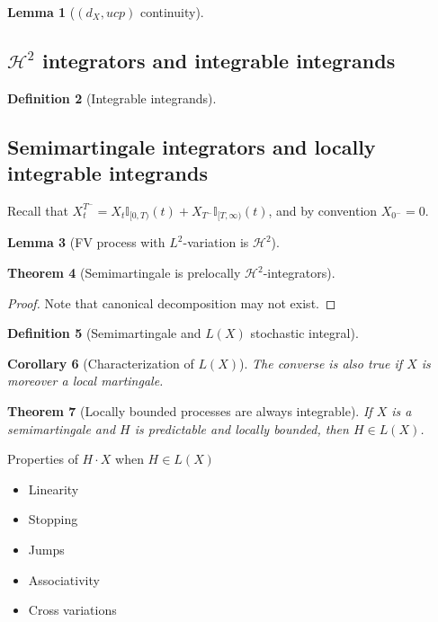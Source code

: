 \documentclass[openany,oneside]{book}
\newtheorem{thm}{Theorem}[section]
\newtheorem{lem}[thm]{Lemma}
\newtheorem{cor}[thm]{Corollary}
\theoremstyle{definition}
\newtheorem{defn}[thm]{Definition}
\theoremstyle{remark}
\newcommand{\I}{\mathbb{I}} %
\newcommand{\sH}[1][2]{\mathcal{H}^{#1}} %
\begin{document}
\begin{lem}[$(d_X,ucp)$ continuity]

\end{lem}

\subsection{$\sH$ integrators and integrable integrands}
\begin{defn}[Integrable integrands]

\end{defn}


\subsection{Semimartingale integrators and locally integrable integrands}
Recall that $X^{T^-}_t = X_t\I_{[0,T)}(t) + X_{T^-}\I_{[T,\infty)}(t)$, and by convention $X_{0^-}=0$.

\begin{lem}[FV process with $L^2$-variation is $\sH$]

\end{lem}

\begin{thm}[Semimartingale is prelocally $\sH$-integrators]

\end{thm}
\begin{proof}
Note that canonical decomposition may not exist.
\end{proof}

\begin{defn}[Semimartingale and $L(X)$ stochastic integral]

\end{defn}



\begin{cor}[Characterization of $L(X)$]
The converse is also true if $X$ is moreover a local martingale.
\end{cor}

\begin{thm}[Locally bounded processes are always integrable]
If $X$ is a semimartingale and $H$ is predictable and locally bounded, then $H\in L(X)$.
\end{thm}

Properties of $H\cdot X$ when $H\in L(X)$
\begin{itemize}
\item Linearity
\item Stopping
\item Jumps
\item Associativity
\item Cross variations
\end{itemize}
\end{document}
